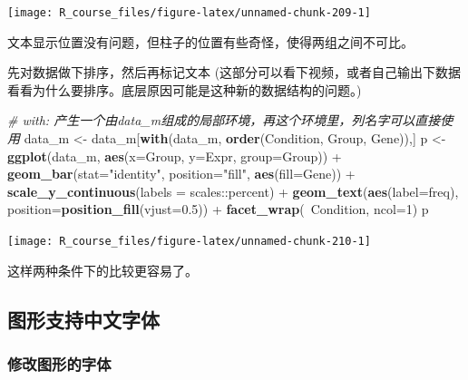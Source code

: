 \documentclass[]{article}
\newenvironment{Shaded}{\begin{snugshade}}{\end{snugshade}}
\newcommand{\KeywordTok}[1]{\textcolor[rgb]{0.13,0.29,0.53}{\textbf{{#1}}}}
\newcommand{\DataTypeTok}[1]{\textcolor[rgb]{0.13,0.29,0.53}{{#1}}}
\newcommand{\DecValTok}[1]{\textcolor[rgb]{0.00,0.00,0.81}{{#1}}}
\newcommand{\FloatTok}[1]{\textcolor[rgb]{0.00,0.00,0.81}{{#1}}}
\newcommand{\StringTok}[1]{\textcolor[rgb]{0.31,0.60,0.02}{{#1}}}
\newcommand{\CommentTok}[1]{\textcolor[rgb]{0.56,0.35,0.01}{\textit{{#1}}}}
\newcommand{\NormalTok}[1]{{#1}}
\numberwithin{figure}{section}
\numberwithin{table}{section}
\theoremstyle{definition}
\theoremstyle{definition}
\theoremstyle{definition}
\theoremstyle{remark}
\begin{document}
\begin{center}\texttt{[image: R\_course\_files/figure-latex/unnamed-chunk-209-1]} \end{center}

文本显示位置没有问题，但柱子的位置有些奇怪，使得两组之间不可比。

先对数据做下排序，然后再标记文本
(这部分可以看下视频，或者自己输出下数据看看为什么要排序。底层原因可能是这种新的数据结构的问题。)

\begin{Shaded}
\begin{Highlighting}[]
\CommentTok{# with: 产生一个由data_m组成的局部环境，再这个环境里，列名字可以直接使用}
\NormalTok{data_m <-}\StringTok{ }\NormalTok{data_m[}\KeywordTok{with}\NormalTok{(data_m, }\KeywordTok{order}\NormalTok{(Condition, Group, Gene)),] }
\NormalTok{p <-}\StringTok{ }\KeywordTok{ggplot}\NormalTok{(data_m, }\KeywordTok{aes}\NormalTok{(}\DataTypeTok{x=}\NormalTok{Group, }\DataTypeTok{y=}\NormalTok{Expr, }\DataTypeTok{group=}\NormalTok{Group)) +}
\StringTok{    }\KeywordTok{geom_bar}\NormalTok{(}\DataTypeTok{stat=}\StringTok{"identity"}\NormalTok{, }\DataTypeTok{position=}\StringTok{"fill"}\NormalTok{, }\KeywordTok{aes}\NormalTok{(}\DataTypeTok{fill=}\NormalTok{Gene)) +}
\StringTok{    }\KeywordTok{scale_y_continuous}\NormalTok{(}\DataTypeTok{labels =} \NormalTok{scales::percent) +}
\StringTok{    }\KeywordTok{geom_text}\NormalTok{(}\KeywordTok{aes}\NormalTok{(}\DataTypeTok{label=}\NormalTok{freq), }\DataTypeTok{position=}\KeywordTok{position_fill}\NormalTok{(}\DataTypeTok{vjust=}\FloatTok{0.5}\NormalTok{)) +}
\StringTok{    }\KeywordTok{facet_wrap}\NormalTok{(~Condition, }\DataTypeTok{ncol=}\DecValTok{1}\NormalTok{)}
\NormalTok{p}
\end{Highlighting}
\end{Shaded}

\begin{center}\texttt{[image: R\_course\_files/figure-latex/unnamed-chunk-210-1]} \end{center}

这样两种条件下的比较更容易了。

\subsection{图形支持中文字体}

\subsubsection{修改图形的字体}
\end{document}
